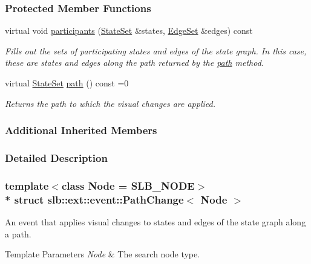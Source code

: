 \subsubsection*{Protected Member Functions}
\begin{DoxyCompactItemize}
\item 
virtual void \hyperlink{structslb_1_1ext_1_1event_1_1PathChange_a4e2ee609bc760e0a25a238277be920ac}{participants} (\hyperlink{structslb_1_1ext_1_1event_1_1UniformChange_a2c45514041ea86f77bbd0147fe06babd}{State\+Set} \&states, \hyperlink{structslb_1_1ext_1_1event_1_1UniformChange_af17825d303d567061f2d510f231d556c}{Edge\+Set} \&edges) const 
\begin{DoxyCompactList}\small\item\em Fills out the sets of participating states and edges of the state graph. In this case, these are states and edges along the path returned by the \hyperlink{structslb_1_1ext_1_1event_1_1PathChange_ac29bb548c1eba3b388ba5344c9072b25}{path} method. \end{DoxyCompactList}\item 
virtual \hyperlink{structslb_1_1ext_1_1event_1_1UniformChange_a2c45514041ea86f77bbd0147fe06babd}{State\+Set} \hyperlink{structslb_1_1ext_1_1event_1_1PathChange_ac29bb548c1eba3b388ba5344c9072b25}{path} () const =0
\begin{DoxyCompactList}\small\item\em Returns the path to which the visual changes are applied. \end{DoxyCompactList}\end{DoxyCompactItemize}
\subsubsection*{Additional Inherited Members}


\subsubsection{Detailed Description}
\subsubsection*{template$<$class Node = S\+L\+B\+\_\+\+N\+O\+DE$>$\\*
struct slb\+::ext\+::event\+::\+Path\+Change$<$ Node $>$}

An event that applies visual changes to states and edges of the state graph along a path. 


\begin{DoxyTemplParams}{Template Parameters}
{\em Node} & The search node type. \\
\hline
\end{DoxyTemplParams}



